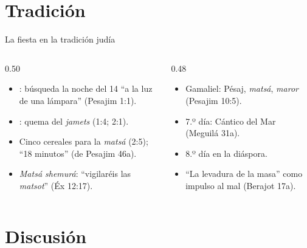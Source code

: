 \section{Tradición}

\begin{frame}{La fiesta en la tradición judía}
\begin{columns}[t,onlytextwidth]
\begin{column}{0.50\textwidth}\scriptsize
\begin{itemize}
\item {}: búsqueda la noche del 14 ``a la luz de una lámpara'' (Pesajim 1:1).
\item {}: quema del \emph{jamets} (1:4; 2:1).
\item Cinco cereales para la \emph{matsá} (2:5); ``18 minutos'' (de Pesajim 46a).
\item \emph{Matsá shemurá}: ``vigilaréis las \emph{matsot}'' (Éx 12:17).
\end{itemize}
\end{column}
\begin{column}{0.48\textwidth}\scriptsize
\begin{itemize}
\item Gamaliel: Pésaj, \emph{matsá}, \emph{maror} (Pesajim 10:5).
\item 7.º día: Cántico del Mar (Meguilá 31a).
\item 8.º día en la diáspora.
\item ``La levadura de la masa'' como impulso al mal (Berajot 17a).
\end{itemize}
\end{column}
\end{columns}\medskip
{}
\end{frame}

\section{Discusión}

